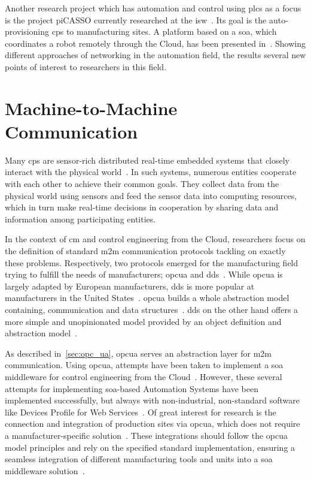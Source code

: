 \documentclass[
a4paper,
twoside,
headsepline,
cleardoublepage=empty,
parskip=half,
draft=false
]{scrbook}
\begin{document}
			Another research project which has automation and control using \gls{plc}s as a focus is the project piCASSO currently researched at the \gls{isw}~\cite{kretschmer2016communication}.
			Its goal is the auto-provisioning \gls{cps} to manufacturing sites.
			A platform based on a \gls{soa}, which coordinates a robot remotely through the Cloud, has been presented in~\cite{kretschmer2016communication}. 
			Showing different approaches of networking in the automation field, the results several new points of interest to researchers in this field.

		\section{Machine-to-Machine Communication}\label{sec:machine_to_machine_communication}
			
			Many \gls{cps} are sensor-rich distributed real-time embedded systems that closely interact with the physical world~\cite{kang2012rdds}. 
			In such systems, numerous entities cooperate with each other to achieve their common goals. 
			They collect data from the physical world using sensors and feed the sensor data into computing resources, which in turn make real-time decisions in cooperation by sharing data and information among participating entities.
			
			In the context of \gls{cm} and control engineering from the Cloud, researchers focus on the definition of standard \gls{m2m} communication protocols tackling on exactly these problems.
			Respectively, two protocols emerged for the manufacturing field trying to fulfill the needs of manufacturers; \gls{opcua} and \gls{dds}~\cite{jazdi2014cyber}.
			While \gls{opcua} is largely adapted by European manufacturers, \gls{dds} is more popular at manufacturers in the United States~\cite{schleipen2008opc}.
			\gls{opcua} builds a whole abstraction model containing, communication and data structures~\cite{candido2010soa}.
			\gls{dds} on the other hand offers a more simple and unopinionated model provided by an object definition and abstraction model~\cite{candido2010soa}.
			
			As described in~\cref{sec:opc_ua}, \gls{opcua} serves an abstraction layer for \gls{m2m} communication. Using \gls{opcua}, attempts have been taken to implement a \gls{soa} middleware for control engineering from the Cloud~\cite{melik2012towards}.
			However, these several attempts for implementing \gls{soa}-based Automation Systems have been implemented successfully, but always with non-industrial, non-standard software like Devices Profile for Web Services~\cite{melik2012towards}.
			Of great interest for research is the connection and integration of production sites via \gls{opcua}, which does not require a manufacturer-specific solution~\cite{melik2012towards}. These integrations should follow the \gls{opcua} model principles and rely on the specified standard implementation, ensuring a seamless integration of different manufacturing tools and units into a \gls{soa} middleware solution~\cite{imtiaz2013scalability}.
			
\end{document}
